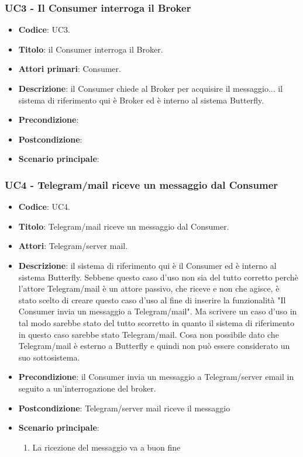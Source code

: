 \subsubsection{UC3 - Il Consumer interroga il Broker}
	\begin{itemize}
		\item \textbf{Codice}: UC3.
		\item \textbf{Titolo}: il Consumer interroga il Broker.
		\item \textbf{Attori primari}: Consumer.
		\item \textbf{Descrizione}: il Consumer chiede al Broker per acquisire il messaggio... il sistema di riferimento qui è Broker ed è interno al sistema Butterfly.
		\item \textbf{Precondizione}:
		\item \textbf{Postcondizione}:
		\item \textbf{Scenario principale}: 
	\end{itemize}


\subsubsection{UC4 - Telegram/mail riceve un messaggio dal Consumer} 
	\begin{itemize}
		\item \textbf{Codice}: UC4.
		\item \textbf{Titolo}: Telegram/mail riceve un messaggio dal Consumer.
		\item \textbf{Attori}: Telegram/server mail.
		\item \textbf{Descrizione}: il sistema di riferimento qui è il Consumer ed è interno al sistema Butterfly.
		Sebbene questo caso d'uso non sia del tutto corretto perchè l'attore Telegram/mail è un attore passivo, che riceve e non che agisce, è stato scelto di creare questo caso d'uso al fine di inserire la funzionalità "Il Consumer invia un messaggio a Telegram/mail". Ma scrivere un caso d'uso in tal modo sarebbe stato del tutto scorretto in quanto il sistema di riferimento in questo caso sarebbe stato Telegram/mail. Cosa non possibile dato che Telegram/mail è esterno a Butterfly e quindi non può essere considerato un suo sottosistema.
		\item \textbf{Precondizione}: il Consumer invia un messaggio a Telegram/server email in seguito a un'interrogazione del broker.
		\item \textbf{Postcondizione}: Telegram/server mail riceve il messaggio
		\item \textbf{Scenario principale}:
		\begin{enumerate}
			\item La ricezione del messaggio va a buon fine
		\end{enumerate} 
	\end{itemize}

